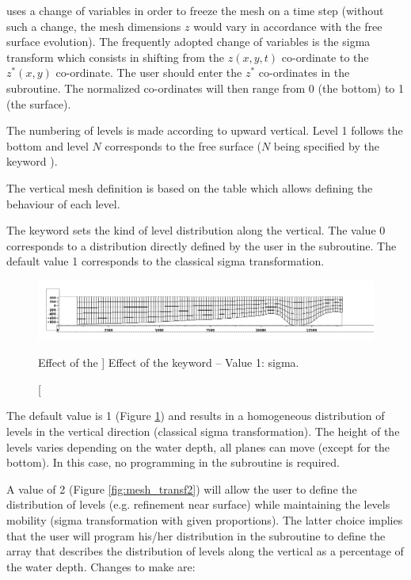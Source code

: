  uses a change of variables in order to freeze the mesh on a time
step (without such a change, the mesh dimensions $z$ would vary in
accordance with the free surface evolution). The frequently adopted change of
variables is the sigma transform which consists in shifting from the $z(x,y,t)$
co-ordinate to the $z^{*} (x,y)$ co-ordinate.
The user should enter the $z^{*}$ co-ordinates in the  subroutine.
The normalized co-ordinates will then range from 0 (the bottom) to 1 (the surface).

The numbering of levels is made according to upward vertical. Level 1 follows
the bottom and level $N$ corresponds to the free surface ($N$
being specified by the keyword ).

The vertical mesh definition is based on the  table which
allows defining the behaviour of each level.

The keyword  sets the kind of level distribution
along the vertical. The value 0 corresponds to a distribution directly defined
by the user in the  subroutine.
The default value 1 corresponds to the classical sigma transformation.

\begin{figure}[H]%
\begin{center}
%
  \includegraphics[width=\textwidth]{./graphics/mesh_transformation}
%
\end{center}
\caption
[Effect of the ]
{Effect of the  keyword -- Value 1: sigma.}
\label{fig:mesh_transf}
\end{figure}

The default value is 1 (Figure \ref{fig:mesh_transf}) and results in a
homogeneous distribution of levels in the vertical direction (classical sigma
transformation). The height of the levels varies depending on the water depth,
all planes can move (except for the bottom). In this case, no programming in
the  subroutine is required.

A value of 2 (Figure \ref{fig:mesh_transf2}) will allow the user to define the
distribution of levels (e.g. refinement near surface) while maintaining the
levels mobility (sigma transformation with given proportions). The latter
choice implies that the user will program his/her distribution in the
 subroutine to define the array  that describes
the distribution of levels along the vertical as a percentage of the water depth.
Changes to make are:

